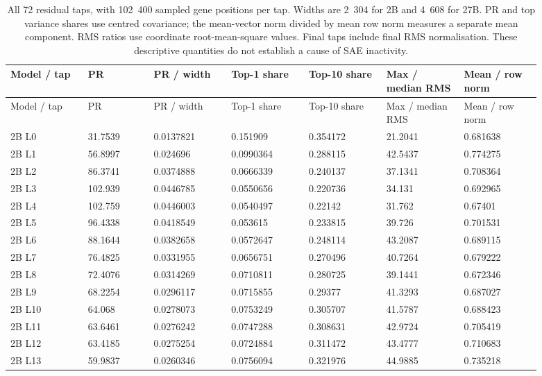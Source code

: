 \begin{longtable}{@{}L{0.13\linewidth}L{0.11\linewidth}L{0.13\linewidth}L{0.13\linewidth}L{0.13\linewidth}L{0.13\linewidth}L{0.13\linewidth}@{}}
\caption{All 72 residual taps, with 102~400 sampled gene positions per tap. Widths are 2~304 for 2B and 4~608 for 27B. PR and top variance shares use centred covariance; the mean-vector norm divided by mean row norm measures a separate mean component. RMS ratios use coordinate root-mean-square values. Final taps include final RMS normalisation. These descriptive quantities do not establish a cause of SAE inactivity.}\\
\toprule
Model / tap & PR & PR / width & Top-1 share & Top-10 share & Max / median RMS & Mean / row norm \\
\midrule
\endfirsthead
\toprule
Model / tap & PR & PR / width & Top-1 share & Top-10 share & Max / median RMS & Mean / row norm \\
\midrule
\endhead
\endfoot
\bottomrule
\endlastfoot
2B L0 & 31.7539 & 0.0137821 & 0.151909 & 0.354172 & 21.2041 & 0.681638 \\
2B L1 & 56.8997 & 0.024696 & 0.0990364 & 0.288115 & 42.5437 & 0.774275 \\
2B L2 & 86.3741 & 0.0374888 & 0.0666339 & 0.240137 & 37.1341 & 0.708364 \\
2B L3 & 102.939 & 0.0446785 & 0.0550656 & 0.220736 & 34.131 & 0.692965 \\
2B L4 & 102.759 & 0.0446003 & 0.0540497 & 0.22142 & 31.762 & 0.67401 \\
2B L5 & 96.4338 & 0.0418549 & 0.053615 & 0.233815 & 39.726 & 0.701531 \\
2B L6 & 88.1644 & 0.0382658 & 0.0572647 & 0.248114 & 43.2087 & 0.689115 \\
2B L7 & 76.4825 & 0.0331955 & 0.0656751 & 0.270496 & 40.7264 & 0.679222 \\
2B L8 & 72.4076 & 0.0314269 & 0.0710811 & 0.280725 & 39.1441 & 0.672346 \\
2B L9 & 68.2254 & 0.0296117 & 0.0715855 & 0.29377 & 41.3293 & 0.687027 \\
2B L10 & 64.068 & 0.0278073 & 0.0753249 & 0.305707 & 41.5787 & 0.688423 \\
2B L11 & 63.6461 & 0.0276242 & 0.0747288 & 0.308631 & 42.9724 & 0.705419 \\
2B L12 & 63.4185 & 0.0275254 & 0.0724884 & 0.311472 & 43.4777 & 0.710683 \\
2B L13 & 59.9837 & 0.0260346 & 0.0756094 & 0.321976 & 44.9885 & 0.735218 \\

\end{longtable}
